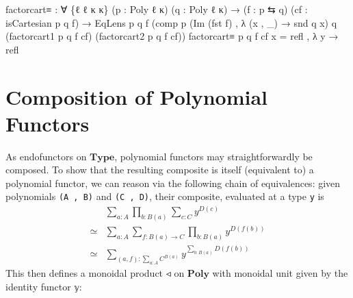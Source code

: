 \documentclass[
  11pt,
  oneside,
  article]{memoir}
\newenvironment{Shaded}{}{}
\newcommand{\NormalTok}[1]{#1}
\newcommand{\OtherTok}[1]{\textcolor[rgb]{0.00,0.44,0.13}{#1}}
\theoremstyle{definition}
\theoremstyle{plain}
\newcommand{\0}{\textsf{0}}
\newcommand{\1}{\tn{\textsf{1}}}
\begin{document}
\begin{Shaded}
\begin{Highlighting}[]
\NormalTok{factorcart≡ }\OtherTok{:} \OtherTok{∀} \OtherTok{\{}\NormalTok{ℓ ℓ\textquotesingle{} κ κ\textquotesingle{}}\OtherTok{\}} \OtherTok{(}\NormalTok{p }\OtherTok{:}\NormalTok{ Poly ℓ κ}\OtherTok{)} \OtherTok{(}\NormalTok{q }\OtherTok{:}\NormalTok{ Poly ℓ\textquotesingle{} κ\textquotesingle{}}\OtherTok{)}
              \OtherTok{→} \OtherTok{(}\NormalTok{f }\OtherTok{:}\NormalTok{ p ⇆ q}\OtherTok{)} \OtherTok{(}\NormalTok{cf }\OtherTok{:}\NormalTok{ isCartesian p q f}\OtherTok{)}
              \OtherTok{→}\NormalTok{ EqLens p q f}
                       \OtherTok{(}\NormalTok{comp p }\OtherTok{(}\NormalTok{Im }\OtherTok{(}\NormalTok{fst f}\OtherTok{)}\NormalTok{ , }\OtherTok{λ} \OtherTok{(}\NormalTok{x , }\OtherTok{\_)} \OtherTok{→}\NormalTok{ snd q x}\OtherTok{)}\NormalTok{ q}
                             \OtherTok{(}\NormalTok{factorcart1 p q f cf}\OtherTok{)}
                             \OtherTok{(}\NormalTok{factorcart2 p q f cf}\OtherTok{))}
\NormalTok{factorcart≡ p q f cf x }\OtherTok{=}\NormalTok{ refl , }\OtherTok{λ}\NormalTok{ y }\OtherTok{→}\NormalTok{ refl}
\end{Highlighting}
\end{Shaded}

\section{Composition of Polynomial
Functors}\label{composition-of-polynomial-functors}

As endofunctors on \(\mathbf{Type}\), polynomial functors may
straightforwardly be composed. To show that the resulting composite is
itself (equivalent to) a polynomial functor, we can reason via the
following chain of equivalences: given polynomials \texttt{(A\ ,\ B)}
and \texttt{(C\ ,\ D)}, their composite, evaluated at a type \texttt{y}
is \[
\begin{array}{rl}
& \sum_{a : A} \prod_{b : B(a)} \sum_{c : C} y^{D(c)}\\
\simeq & \sum_{a : A} \sum_{f : B(a) \to C} \prod_{b : B(a)} y^{D(f(b))}\\
\simeq & \sum_{(a , f) : \sum_{a : A} C^{B(a)}} y^{\sum_{b : B(a)} D(f(b))}
\end{array}
\] This then defines a monoidal product \(◃\) on \(\mathbf{Poly}\) with
monoidal unit given by the identity functor \texttt{𝕪}:
\end{document}
